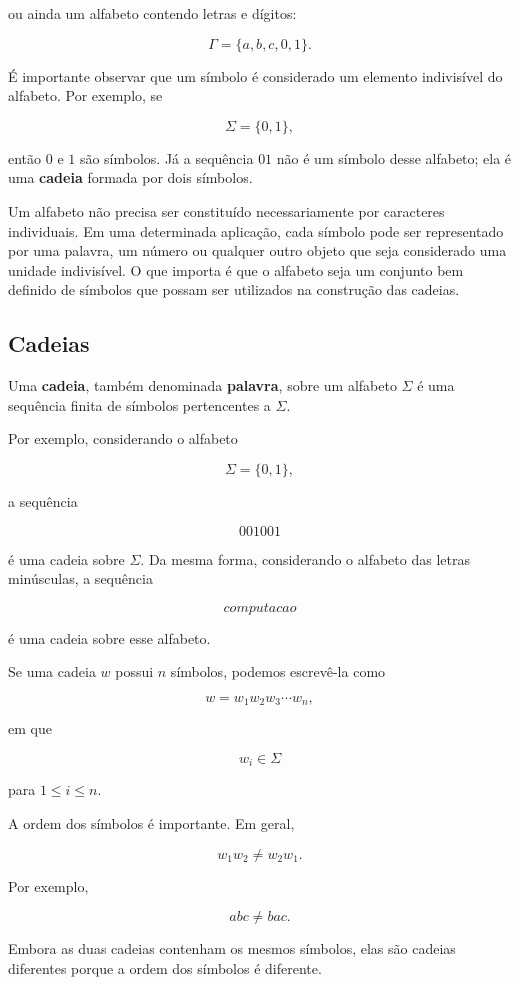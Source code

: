 \documentclass[
  brazilian,
  letterpaper,
]{book}
\theoremstyle{plain}
\theoremstyle{definition}
\theoremstyle{remark}
\begin{document}
ou ainda um alfabeto contendo letras e dígitos:

\[
\Gamma=\{a,b,c,0,1\}.
\]

É importante observar que um símbolo é considerado um elemento
indivisível do alfabeto. Por exemplo, se

\[
\Sigma=\{0,1\},
\]

então \(0\) e \(1\) são símbolos. Já a sequência \(01\) não é um símbolo
desse alfabeto; ela é uma \textbf{cadeia} formada por dois símbolos.

Um alfabeto não precisa ser constituído necessariamente por caracteres
individuais. Em uma determinada aplicação, cada símbolo pode ser
representado por uma palavra, um número ou qualquer outro objeto que
seja considerado uma unidade indivisível. O que importa é que o alfabeto
seja um conjunto bem definido de símbolos que possam ser utilizados na
construção das cadeias.

\subsection{Cadeias}\label{cadeias}

Uma \textbf{cadeia}, também denominada \textbf{palavra}, sobre um
alfabeto \(\Sigma\) é uma sequência finita de símbolos pertencentes a
\(\Sigma\).

Por exemplo, considerando o alfabeto

\[
\Sigma=\{0,1\},
\]

a sequência

\[
001001
\]

é uma cadeia sobre \(\Sigma\). Da mesma forma, considerando o alfabeto
das letras minúsculas, a sequência

\[
computacao
\]

é uma cadeia sobre esse alfabeto.

Se uma cadeia \(w\) possui \(n\) símbolos, podemos escrevê-la como

\[
w=w_1w_2w_3\cdots w_n,
\]

em que

\[
w_i\in\Sigma
\]

para \(1\leq i\leq n\).

A ordem dos símbolos é importante. Em geral,

\[
w_1w_2\neq w_2w_1.
\]

Por exemplo,

\[
abc\neq bac.
\]

Embora as duas cadeias contenham os mesmos símbolos, elas são cadeias
diferentes porque a ordem dos símbolos é diferente.
\end{document}
